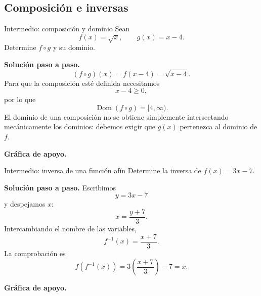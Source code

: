 \documentclass[aspectratio=169,10pt]{beamer}
\newcommand{\Dom}{\operatorname{Dom}}
\begin{document}
\subsection*{Composición e inversas}

\begin{frame}{Intermedio: composición y dominio}
Sean
\[
f(x)=\sqrt{x},\qquad g(x)=x-4.
\]
Determine $f\circ g$ y su dominio.

\textbf{Solución paso a paso.}
\[
(f\circ g)(x)=f(x-4)=\sqrt{x-4}.
\]
Para que la composición esté definida necesitamos
\[
x-4\ge0,
\]
por lo que
\[
\boxed{\Dom(f\circ g)=[4,\infty)}.
\]
El dominio de una composición no se obtiene simplemente intersectando mecánicamente los dominios: debemos exigir que $g(x)$ pertenezca al dominio de $f$.


\textbf{Gráfica de apoyo.}\medskip
\begin{center}
\end{center}

\end{frame}

\begin{frame}{Intermedio: inversa de una función afín}
Determine la inversa de $f(x)=3x-7$.

\textbf{Solución paso a paso.} Escribimos
\[
y=3x-7
\]
y despejamos $x$:
\[
x=\frac{y+7}{3}.
\]
Intercambiando el nombre de las variables,
\[
\boxed{f^{-1}(x)=\frac{x+7}{3}}.
\]
La comprobación es
\[
f(f^{-1}(x))=3\left(\frac{x+7}{3}\right)-7=x.
\]


\textbf{Gráfica de apoyo.}\medskip
\begin{center}
\end{center}

\end{frame}
\end{document}
